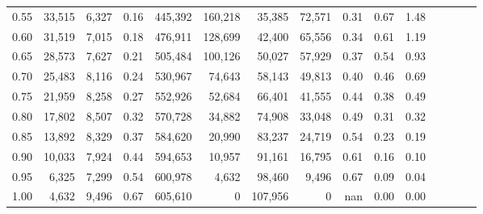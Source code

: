 \begin{tabular}{rrrcrrrrrrrrrrr}
0.55 &  33,515 &  6,327 &                                       0.16 &  445,392 &  160,218 &   35,385 &   72,571 &  0.31 &  0.67 &                         1.48 \\
0.60 &  31,519 &  7,015 &                                       0.18 &  476,911 &  128,699 &   42,400 &   65,556 &  0.34 &  0.61 &                         1.19 \\
0.65 &  28,573 &  7,627 &                                       0.21 &  505,484 &  100,126 &   50,027 &   57,929 &  0.37 &  0.54 &                         0.93 \\
0.70 &  25,483 &  8,116 &                                       0.24 &  530,967 &   74,643 &   58,143 &   49,813 &  0.40 &  0.46 &                         0.69 \\
0.75 &  21,959 &  8,258 &                                       0.27 &  552,926 &   52,684 &   66,401 &   41,555 &  0.44 &  0.38 &                         0.49 \\
0.80 &  17,802 &  8,507 &                                       0.32 &  570,728 &   34,882 &   74,908 &   33,048 &  0.49 &  0.31 &                         0.32 \\
0.85 &  13,892 &  8,329 &                                       0.37 &  584,620 &   20,990 &   83,237 &   24,719 &  0.54 &  0.23 &                         0.19 \\
0.90 &  10,033 &  7,924 &                                       0.44 &  594,653 &   10,957 &   91,161 &   16,795 &  0.61 &  0.16 &                         0.10 \\
0.95 &   6,325 &  7,299 &                                       0.54 &  600,978 &    4,632 &   98,460 &    9,496 &  0.67 &  0.09 &                         0.04 \\
1.00 &   4,632 &  9,496 &                                       0.67 &  605,610 &        0 &  107,956 &        0 &   nan &  0.00 &                         0.00 \\
\bottomrule
\end{tabular}
